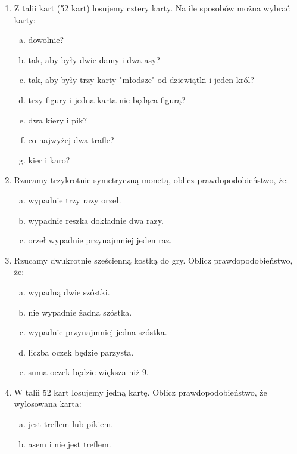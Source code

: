 \documentclass[12pt,a4paper]{article}
\begin{document}
\begin{enumerate}[1.]
\begin{enumerate}[a)]
	\item STRAJK
	\item KAJAK
	\item KANAPKA
	\item MATEMATYKA
	\item KONSTANTYNOPOLITAŃCZYKÓWIANECZKA*
\end{enumerate}
(* tam są 32 litery)
\item Z talii kart (52 kart) losujemy cztery karty. Na ile sposobów można wybrać karty:
\begin{enumerate}[a)]
	\item dowolnie?
	\item tak, aby były dwie damy i dwa asy?
	\item tak, aby były trzy karty "młodsze" od dziewiątki i jeden król?
	\item trzy figury i jedna karta nie będąca figurą?
	\item dwa kiery i pik?
	\item co najwyżej dwa trafle?
	\item kier i karo?
\end{enumerate}
\newpage
\item Rzucamy trzykrotnie symetryczną monetą, oblicz prawdopodobieństwo, że:
\begin{enumerate}[a)]
	\item wypadnie trzy razy orzeł.
	\item wypadnie reszka dokładnie dwa razy.
	\item orzeł wypadnie przynajmniej jeden raz.
\end{enumerate}
\item Rzucamy dwukrotnie sześcienną kostką do gry. Oblicz prawdopodobieństwo, że:
\begin{enumerate}[a)]
	\item wypadną dwie szóstki.
	\item nie wypadnie żadna szóstka.
	\item wypadnie przynajmniej jedna szóstka.
	\item liczba oczek będzie parzysta.
	\item suma oczek będzie większa niż 9.
\end{enumerate}
\item W talii 52 kart losujemy jedną kartę. Oblicz prawdopodobieństwo, że wylosowana karta:
\begin{enumerate}[a)]
	\item jest treflem lub pikiem.
	\item asem i nie jest treflem.

\end{enumerate}
\end{enumerate}
\end{document}
